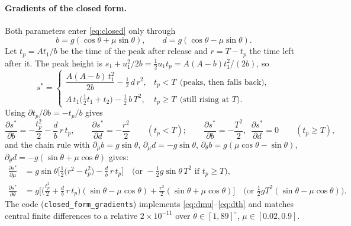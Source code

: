 \documentclass[11pt,a4paper]{article}
\newcommand{\code}[1]{\texttt{#1}}
\begin{document}
\paragraph{Gradients of the closed form.} Both parameters enter \eqref{eq:closed} only through
\[
  b=g(\cos\theta+\mu\sin\theta),\qquad d=g(\cos\theta-\mu\sin\theta).
\]
Let $t_p=At_1/b$ be the time of the peak after release and $r=T-t_p$ the time left after it. The peak height is
$s_1+u_1^2/2b=\tfrac12u_1t_p=A(A-b)t_1^2/(2b)$, so
\begin{equation}
  s^*=
  \begin{cases}
    \dfrac{A(A-b)\,t_1^2}{2b}-\tfrac12\,d\,r^2, & t_p<T \ \ \text{(peaks, then falls back)},\\[8pt]
    A\,t_1\big(\tfrac12t_1+t_2\big)-\tfrac12\,b\,T^2, & t_p\ge T\ \ \text{(still rising at } T).
  \end{cases}
\end{equation}
Using $\partial t_p/\partial b=-t_p/b$ gives
\begin{equation}
  \frac{\partial s^*}{\partial b}=-\frac{t_p^2}{2}-\frac{d}{b}\,r\,t_p,\qquad
  \frac{\partial s^*}{\partial d}=-\frac{r^2}{2}\qquad(t_p<T);\qquad
  \frac{\partial s^*}{\partial b}=-\frac{T^2}{2},\ \ \frac{\partial s^*}{\partial d}=0\qquad(t_p\ge T),
  \label{eq:partials}
\end{equation}
and the chain rule with $\partial_\mu b=g\sin\theta$, $\partial_\mu d=-g\sin\theta$,
$\partial_\theta b=g(\mu\cos\theta-\sin\theta)$, $\partial_\theta d=-g(\sin\theta+\mu\cos\theta)$ gives:
\begin{align}
  \frac{\partial s^*}{\partial\mu}&=g\sin\theta\Big[\tfrac12\big(r^2-t_p^2\big)-\tfrac{d}{b}\,r\,t_p\Big]
  \quad\big(\text{or } -\tfrac12 g\sin\theta\,T^2 \text{ if } t_p\ge T\big),\label{eq:dmu}\\
  \frac{\partial s^*}{\partial\theta}&=g\Big[\big(\tfrac{t_p^2}{2}+\tfrac{d}{b}\,r\,t_p\big)(\sin\theta-\mu\cos\theta)
      +\tfrac{r^2}{2}(\sin\theta+\mu\cos\theta)\Big]
  \quad\big(\text{or } \tfrac12 gT^2(\sin\theta-\mu\cos\theta)\big).\label{eq:dth}
\end{align}
The code (\code{closed\_form\_gradients}) implements \eqref{eq:dmu}--\eqref{eq:dth} and matches central finite
differences to a relative $2\times10^{-11}$ over $\theta\in[1,89]^\circ$, $\mu\in[0.02,0.9]$.
\end{document}
